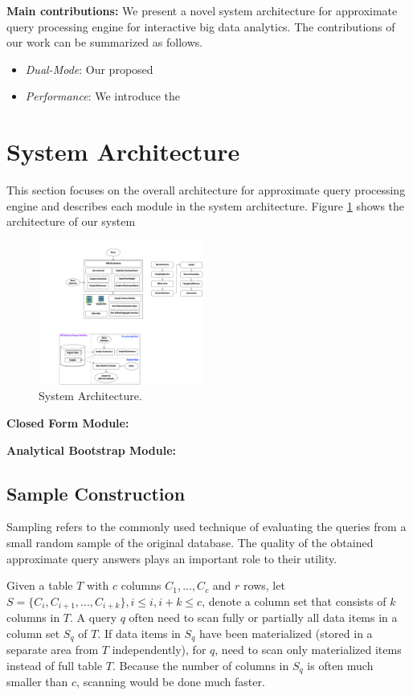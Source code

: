 \documentclass{sig-alternate-05-2015}
\newcommand{\bi}{\begin{itemize}}
\newcommand{\ei}{\end{itemize}}
\newcommand{\ii}{\item}
\begin{document}
\noindent
\textbf{Main contributions:} We present a novel system architecture for approximate query processing engine for interactive big data analytics. The contributions of our work can be summarized as follows.
\bi
\ii \textit{Dual-Mode}: 
Our proposed 
\ii \textit{Performance}: 
We introduce the 
\ei


\section{System Architecture}
This section focuses on the overall architecture for approximate query processing engine and describes each module in the system architecture. Figure \ref{fig:architecture} shows the architecture of our system
\begin{figure}[htb]
        \centering
        \includegraphics[width=0.48\textwidth]{architecture.pdf}
        \caption{System Architecture.}
        \label{fig:architecture}
\end{figure}

\noindent
\textbf{Closed Form Module:} 

\noindent
\textbf{Analytical Bootstrap Module:} 

\subsection{Sample Construction}
Sampling refers to the commonly used technique of evaluating the queries from a small random sample of the original database. The quality of the obtained approximate query answers plays an important role to their utility.

Given a table $T$ with $c$ columns $C_1, ..., C_c$ and $r$ rows, let $S=\{C_i, C_{i+1}, ..., C_{i+k}\}, i \leq i, i+k \leq c$, denote a column set that consists of $k$ columns in $T$. A query $q$ often need to scan fully or partially all data items in a column set $S_q$ of $T$. If data items in $S_q$ have been materialized (stored in a separate area from $T$ independently), for $q$, need to scan only materialized items instead of full table $T$. Because the number of columns in $S_q$ is often much smaller than $c$, scanning would be done much faster.
\end{document}
